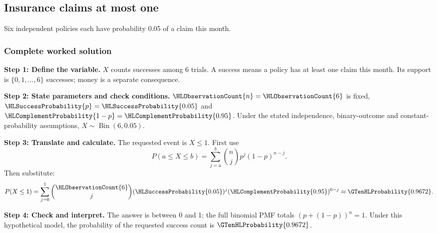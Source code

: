 \subsection{Insurance claims at most one}\label{prob:claims}
Six independent policies each have probability 0.05 of a claim this month.


\subsubsection*{Complete worked solution}\label{sol:claims}
\par\noindent\begin{minipage}{\linewidth}
\textbf{Step 1: Define the variable.} $X$ counts successes among 6 trials. A success means a policy has at least one claim this month. Its support is $\{0,1,\ldots,6\}$ successes; money is a separate consequence.
\end{minipage}\par\medskip
\par\noindent\begin{minipage}{\linewidth}
\textbf{Step 2: State parameters and check conditions.} $\HLObservationCount{n}=\HLObservationCount{6}$ is fixed, $\HLSuccessProbability{p}=\HLSuccessProbability{0.05}$ and $\HLComplementProbability{1-p}=\HLComplementProbability{0.95}$. Under the stated independence, binary-outcome and constant-probability assumptions, $X\sim\operatorname{Bin}(6,0.05)$.
\end{minipage}\par\medskip
\par\noindent\begin{minipage}{\linewidth}
\textbf{Step 3: Translate and calculate.} The requested event is $ X\leq1$. First use
\[P(a\leq X\leq b)=\sum_{j=a}^{b}\binom nj p^j(1-p)^{n-j}.\]
Then substitute:
\[P(X\leq1)=\sum_{j=0}^{1}\binom{\HLObservationCount{6}}j(\HLSuccessProbability{0.05})^j(\HLComplementProbability{0.95})^{6-j}\approx \GTenHLProbability{0.9672}.\]
\end{minipage}\par\medskip
\par\noindent\begin{minipage}{\linewidth}
\textbf{Step 4: Check and interpret.} The answer is between 0 and 1; the full binomial PMF totals $(p+(1-p))^n=1$. Under this hypothetical model, the probability of the requested success count is $\GTenHLProbability{0.9672}$.
\end{minipage}\par\medskip

